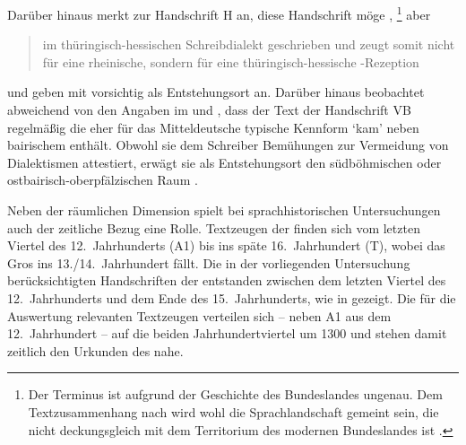 Darüber hinaus merkt \citet{klein1988} zur Handschrift H an, diese
Handschrift möge ,%
%
	\footnote{Der Terminus  ist aufgrund der Geschichte des
	Bundeslandes ungenau. Dem Textzusammenhang nach wird wohl die
	Sprachlandschaft gemeint sein, die nicht deckungsgleich mit dem Territorium
	des modernen Bundeslandes ist \autocite[vgl.~z.\,B.][853]{wiesinger1983}.}
%
aber \blockcquote[118]{klein1988}{im thüringisch-hessischen
Schreibdialekt geschrieben und zeugt somit nicht für eine rheinische, sondern
für eine thüringisch-hessische
\nocite{schroeder1895}-Rezeption}. \citet{kcdigital} und
\citet[23]{wolf:kckat} geben mit \citet[237--238]{millerzimmermann2007}
vorsichtig  als Entstehungsort an.
%
\label{phsec:vbherkunft}%
Darüber hinaus beobachtet \citeauthor{schneider1987} abweichend von den Angaben
im  und \citet{kcdigital}, dass der Text der Handschrift VB
regelmäßig die eher für das Mitteldeutsche typische Kennform
 `kam' neben bairischem 
enthält. Obwohl sie dem Schreiber Bemühungen zur Vermeidung von Dialektismen
attestiert, erwägt sie als Entstehungsort den südböhmischen oder
ostbairisch-oberpfälzischen Raum
\autocite[226]{schneider1987}.

Neben der räumlichen Dimension spielt bei sprachhistorischen Untersuchungen
auch der zeitliche Bezug eine Rolle. Textzeugen der \KC{} finden sich vom
letzten Viertel des 12.~Jahrhunderts (A1) bis ins späte
16.~Jahrhundert (T), wobei das Gros ins 13./14.~Jahrhundert fällt.
Die in der vorliegenden Untersuchung berücksichtigten Handschriften der
\KC{} entstanden zwischen dem letzten Viertel des 12.~Jahrhunderts und dem
Ende des 15.~Jahrhunderts, wie in  gezeigt. Die für die
Auswertung relevanten Textzeugen verteilen sich -- neben A1 aus dem
12.~Jahrhundert -- auf die beiden Jahrhundertviertel um 1300 und stehen damit
zeitlich den Urkunden des \CAO{} nahe.

